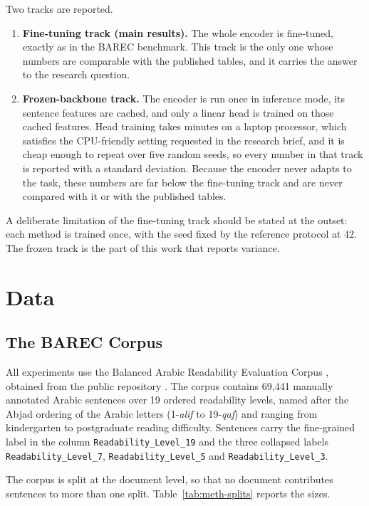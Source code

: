 Two tracks are reported.

\begin{enumerate}
\item \textbf{Fine-tuning track (main results).} The whole encoder is fine-tuned, exactly as in
the BAREC benchmark. This track is the only one whose numbers are comparable with the published
tables, and it carries the answer to the research question.

\item \textbf{Frozen-backbone track.} The encoder is run once in inference mode, its sentence
features are cached, and only a linear head is trained on those cached features. Head training
takes minutes on a laptop processor, which satisfies the CPU-friendly setting requested in the
research brief, and it is cheap enough to repeat over five random seeds, so every number in
that track is reported with a standard deviation. Because the encoder never adapts to the task,
these numbers are far below the fine-tuning track and are never compared with it or with the
published tables.
\end{enumerate}

A deliberate limitation of the fine-tuning track should be stated at the outset: each method is
trained once, with the seed fixed by the reference protocol at 42. The frozen track is the part
of this work that reports variance.

\section{Data}
\label{sec:meth-data}

\subsection{The BAREC Corpus}

All experiments use the Balanced Arabic Readability Evaluation Corpus
\cite{elmadani2025barec}, obtained from the public repository \texttt{\datasetName}. The corpus
contains 69{,}441 manually annotated Arabic sentences over 19 ordered readability levels, named
after the Abjad ordering of the Arabic letters (1-\textit{alif} to 19-\textit{qaf}) and ranging
from kindergarten to postgraduate reading difficulty. Sentences carry the fine-grained label in
the column \texttt{Readability\_Level\_19} and the three collapsed labels
\texttt{Readability\_Level\_7}, \texttt{Readability\_Level\_5} and
\texttt{Readability\_Level\_3}.

The corpus is split at the document level, so that no document contributes sentences to more
than one split. Table~\ref{tab:meth-splits} reports the sizes.

